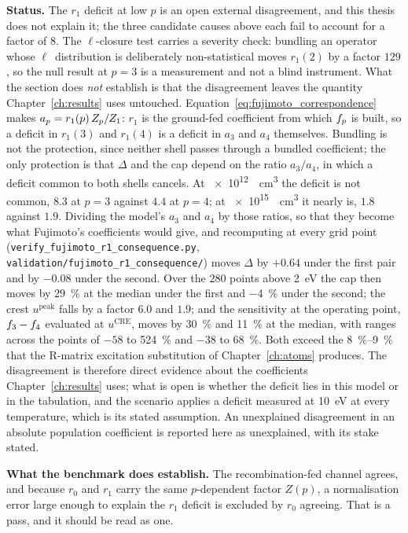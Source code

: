 \textbf{Status.} The $r_1$ deficit at low $p$ is an open external
disagreement, and this thesis does not explain it; the three candidate causes
above each fail to account for a factor of $8$. The $\ell$-closure test carries
a severity check: bundling an operator whose $\ell$~distribution is deliberately
non-statistical moves $r_1(2)$ by a factor $129$, so the null result at $p=3$ is
a measurement and not a blind instrument. What the section does \emph{not}
establish is that the disagreement leaves the quantity
Chapter~\ref{ch:results} uses untouched.
Equation~\eqref{eq:fujimoto_correspondence} makes
$a_p = r_1(p)\,Z_{p}/Z_{1}$: $r_1$ is the ground-fed coefficient from which
$f_{p}$ is built, so a deficit in $r_1(3)$ and $r_1(4)$ is a deficit in
$a_3$ and $a_4$ themselves. Bundling is not the protection, since neither shell
passes through a bundled coefficient; the only protection is that $\Delta$ and
the cap depend on the ratio $a_3/a_4$, in which a deficit common to both shells
cancels. At \SI{e12}{\per\cubic\centi\metre} the deficit is not common, $8.3$
at $p=3$ against $4.4$ at $p=4$; at \SI{e15}{\per\cubic\centi\metre} it nearly
is, $1.8$ against $1.9$. Dividing the model's $a_3$ and $a_4$ by those ratios,
so that they become what Fujimoto's coefficients would give, and recomputing
at every grid point (\texttt{verify\_fujimoto\_r1\_consequence.py},
\texttt{validation/fujimoto\_r1\_consequence/}) moves $\Delta$ by $+0.64$
under the first pair and by $-0.08$ under the second. Over the $280$ points
above \SI{2}{\electronvolt} the cap then moves by \SI{+29}{\percent} at the
median under the first and \SI{-4}{\percent} under the second; the crest
$u^{\mathrm{peak}}$ falls by a factor $6.0$ and $1.9$; and the sensitivity at
the operating point, $f_{3}-f_{4}$ evaluated at $u^{\mathrm{CRE}}$,
moves by \SI{+30}{\percent} and \SI{+11}{\percent} at the median, with ranges
across the points of $-58$ to \SI{+524}{\percent} and $-38$ to
\SI{+68}{\percent}. Both exceed the \SIrange{8}{9}{\percent} that the R-matrix
excitation substitution of Chapter~\ref{ch:atoms} produces. The disagreement
is therefore direct evidence about the coefficients Chapter~\ref{ch:results}
uses; what is open is whether the deficit lies in this model or in the
tabulation, and the scenario applies a deficit measured at
\SI{10}{\electronvolt} at every temperature, which is its stated assumption.
An unexplained disagreement in an absolute population coefficient is reported
here as unexplained, with its stake stated.

\textbf{What the benchmark does establish.} The recombination-fed channel
agrees, and because $r_0$ and $r_1$ carry the same $p$-dependent factor $Z(p)$,
a normalisation error large enough to explain the $r_1$ deficit is excluded by
$r_0$ agreeing. That is a pass, and it should be read as one.

